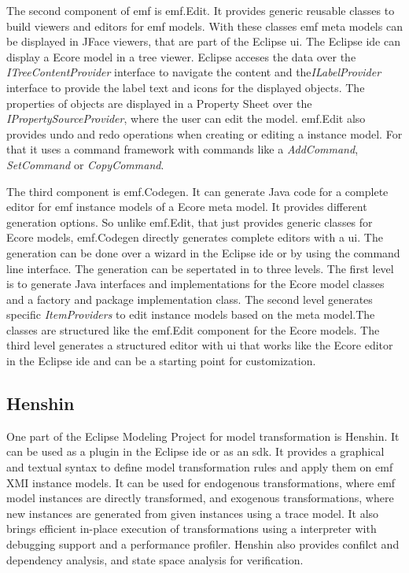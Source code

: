 \documentclass[conference,onecolumn]{IEEEtran}
\begin{document}
    The second component of \ac{emf} is \ac{emf}.Edit. It provides generic reusable classes to build viewers and editors for \ac{emf} models. With these classes \ac{emf} meta models can be displayed in JFace viewers, that are part of the Eclipse \acs{ui}. \cite{eclipse_emf} The Eclipse \ac{ide} can display a Ecore model in a tree viewer. Eclipse acceses the data over the \textit{ITreeContentProvider} interface to navigate the content and the\textit{ILabelProvider} interface to provide the label text and icons for the displayed objects.  The properties of objects are displayed in a Property Sheet over the \textit{IPropertySourceProvider}, where the user can edit the model.  \ac{emf}.Edit also provides undo and redo operations when creating or editing a instance model. For that it uses a command framework with commands like a \textit{AddCommand}, \textit{SetCommand} or \textit{CopyCommand}. \cite{emf}

    The third component is \ac{emf}.Codegen. It can generate Java code for a complete editor for \ac{emf} instance models of a Ecore meta model. It provides different generation options. So unlike \ac{emf}.Edit, that just provides generic classes for Ecore models, \ac{emf}.Codegen directly generates complete editors with a \acs{ui}. \cite{eclipse_emf} The generation can be done over a wizard in the Eclipse \ac{ide} or by using the command line interface. \cite{emf} The generation can be sepertated in to three levels. The first level is to generate Java interfaces and implementations for the Ecore model classes and a factory and package implementation class. The second level generates specific \textit{ItemProviders} to edit instance models based on the meta model.The classes are structured like the \ac{emf}.Edit component for the Ecore models. The third level generates a structured editor with \acs{ui} that works like the Ecore editor in the Eclipse \ac{ide} and can be a starting point for customization. \cite{eclipse_emf}

  \subsection{Henshin}
  \label{subsec:henshin}

  One part of the Eclipse Modeling Project for model transformation is Henshin. It can be used as a plugin in the Eclipse \ac{ide} or as an \acs{sdk}. It provides a graphical and textual syntax to define model transformation rules and apply them on \ac{emf} XMI instance models. It can be used for endogenous transformations, where \ac{emf} model instances are directly transformed, and exogenous transformations, where new instances are generated from given instances using a trace model. It also brings efficient in-place execution of transformations using a interpreter with debugging support and a performance profiler. Henshin also provides confilct and dependency analysis, and state space analysis for verification. \cite{henshin-repo}
\end{document}
